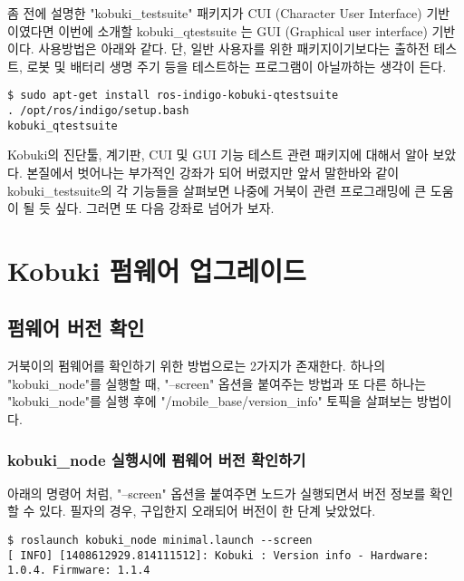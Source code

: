 좀 전에 설명한 "kobuki\_testsuite" 패키지가 CUI (Character User Interface) 기반 이였다면 이번에 소개할 kobuki\_qtestsuite 는 GUI (Graphical user interface) 기반이다. 사용방법은 아래와 같다. 단, 일반 사용자를 위한 패키지이기보다는 출하전 테스트, 로봇 및 배터리 생명 주기 등을 테스트하는 프로그램이 아닐까하는 생각이 든다.

\vspace{\baselineskip}
\begin{lstlisting}[language=ROS]
$ sudo apt-get install ros-indigo-kobuki-qtestsuite
. /opt/ros/indigo/setup.bash
kobuki_qtestsuite
\end{lstlisting}

Kobuki의 진단툴, 계기판, CUI 및 GUI 기능 테스트 관련 패키지에 대해서 알아 보았다. 본질에서 벗어나는 부가적인 강좌가 되어 버렸지만 앞서 말한바와 같이 kobuki\_testsuite의 각 기능들을 살펴보면 나중에 거북이 관련 프로그래밍에 큰 도움이 될 듯 싶다. 그러면 또 다음 강좌로 넘어가 보자.

\section{Kobuki 펌웨어 업그레이드}

\subsection{펌웨어 버전 확인}

거북이의 펌웨어를 확인하기 위한 방법으로는 2가지가 존재한다. 하나의 "kobuki\_node"를 실행할 때, "--screen" 옵션을 붙여주는 방법과 또 다른 하나는 "kobuki\_node"를 실행 후에 "/mobile\_base/version\_info" 토픽을 살펴보는 방법이다.

\subsubsection{kobuki\_node 실행시에 펌웨어 버전 확인하기 }

아래의 명령어 처럼, "--screen" 옵션을 붙여주면 노드가 실행되면서 버전 정보를 확인할 수 있다. 필자의 경우, 구입한지 오래되어 버전이 한 단계 낮았었다.

\vspace{\baselineskip}
\begin{lstlisting}[language=ROS]
$ roslaunch kobuki_node minimal.launch --screen
[ INFO] [1408612929.814111512]: Kobuki : Version info - Hardware: 1.0.4. Firmware: 1.1.4
\end{lstlisting}


